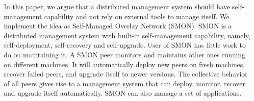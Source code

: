
In this paper, we argue that a distributed management system
should have self-management capability and not rely on
external tools to manage itself. We implement the idea as
Self-Managed Overlay Network (SMON). SMON is a distributed
management system with built-in self-management capability,
namely, self-deployment, self-recovery and self-upgrade.
User of SMON has little work to do on maintaining it. A SMON
peer monitors and maintains other ones running on different
machines. It will automatically deploy new peers on fresh
machines, recover failed peers, and upgrade itself to newer
versions. The collective behavior of all peers gives rise to
a management system that can deploy, monitor, recover and
upgrade itself automatically. SMON can also manage a set of
applications.


